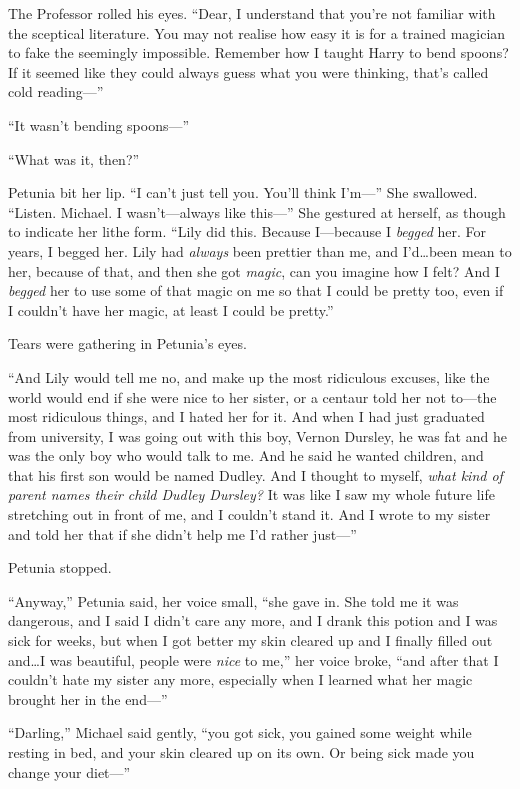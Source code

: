 The Professor rolled his eyes. “Dear, I understand that you’re not familiar with the sceptical literature. You may not realise how easy it is for a trained magician to fake the seemingly impossible. Remember how I taught Harry to bend spoons? If it seemed like they could always guess what you were thinking, that’s called cold reading—”

“It wasn’t bending spoons—”

“What was it, then?”

Petunia bit her lip. “I can’t just tell you. You’ll think I’m—” She swallowed. “Listen. Michael. I wasn’t—always like this—” She gestured at herself, as though to indicate her lithe form. “Lily did this. Because I—because I \emph{begged} her. For years, I begged her. Lily had \emph{always} been prettier than me, and I’d…been mean to her, because of that, and then she got \emph{magic}, can you imagine how I felt? And I \emph{begged} her to use some of that magic on me so that I could be pretty too, even if I couldn’t have her magic, at least I could be pretty.”

Tears were gathering in Petunia’s eyes.

“And Lily would tell me no, and make up the most ridiculous excuses, like the world would end if she were nice to her sister, or a centaur told her not to—the most ridiculous things, and I hated her for it. And when I had just graduated from university, I was going out with this boy, Vernon Dursley, he was fat and he was the only boy who would talk to me. And he said he wanted children, and that his first son would be named Dudley. And I thought to myself, \emph{what kind of parent names their child Dudley Dursley?} It was like I saw my whole future life stretching out in front of me, and I couldn’t stand it. And I wrote to my sister and told her that if she didn’t help me I’d rather just—”

Petunia stopped.

“Anyway,” Petunia said, her voice small, “she gave in. She told me it was dangerous, and I said I didn’t care any more, and I drank this potion and I was sick for weeks, but when I got better my skin cleared up and I finally filled out and…I was beautiful, people were \emph{nice} to me,” her voice broke, “and after that I couldn’t hate my sister any more, especially when I learned what her magic brought her in the end—”

“Darling,” Michael said gently, “you got sick, you gained some weight while resting in bed, and your skin cleared up on its own. Or being sick made you change your diet—”

